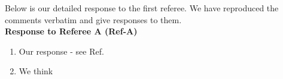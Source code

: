 
Below is our detailed response to the first referee. We have reproduced the comments verbatim and give responses to them.\\

\bigskip
\noindent\textbf{Response to Referee A (Ref-A)}
%

\begin{enumerate}[start=1,label={\color{black}(\bfseries Ref-A \arabic*):}]
	\item {}
	
Our response - see Ref.\cite{Nicholson2020}
	
	\item {}
	
	We think 
\end{enumerate}


